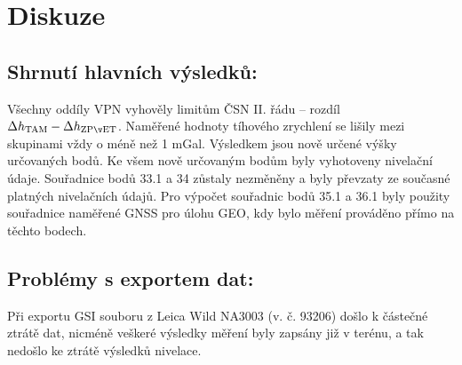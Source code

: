 \section{Diskuze}


\subsection{Shrnutí hlavních výsledků:}
Všechny oddíly VPN vyhověly limitům ČSN II. řádu – rozdíl \(\Delta h_{\rm TAM}-\Delta h_{\rm ZPĚT}\).
Naměřené hodnoty tíhového zrychlení se lišily mezi skupinami vždy o méně než 1 mGal. Výsledkem jsou nově určené výšky určovaných bodů. Ke všem nově určovaným bodům byly vyhotoveny nivelační údaje. Souřadnice bodů 33.1 a 34 zůstaly nezměněny a byly převzaty ze současné platných nivelačních údajů. Pro výpočet souřadnic bodů 35.1 a 36.1 byly použity souřadnice naměřené GNSS pro úlohu GEO, kdy bylo měření prováděno přímo na těchto bodech.

\subsection{Problémy s exportem dat:}
    Při exportu GSI souboru z Leica Wild NA3003 (v. č. 93206) došlo k částečné ztrátě dat, nicméně veškeré výsledky měření byly zapsány již v terénu, a tak nedošlo ke ztrátě výsledků nivelace.